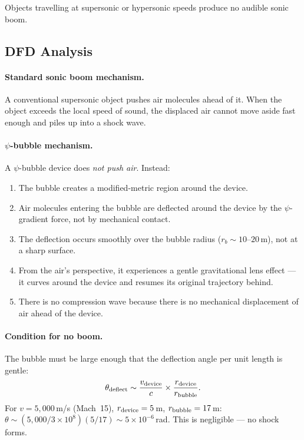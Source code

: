 \documentclass[12pt,a4paper]{article}
\begin{document}
Objects travelling at supersonic or hypersonic speeds produce no audible
sonic boom.

\subsection{DFD Analysis}

\paragraph{Standard sonic boom mechanism.}
A conventional supersonic object pushes air molecules ahead of it.  When
the object exceeds the local speed of sound, the displaced air cannot
move aside fast enough and piles up into a shock wave.

\paragraph{$\psi$-bubble mechanism.}
A $\psi$-bubble device does \emph{not push air}.  Instead:
\begin{enumerate}
\item The bubble creates a modified-metric region around the device.
\item Air molecules entering the bubble are deflected around the device
  by the $\psi$-gradient force, not by mechanical contact.
\item The deflection occurs smoothly over the bubble radius
  ($r_b \sim 10$--$20$\,m), not at a sharp surface.
\item From the air's perspective, it experiences a gentle gravitational
  lens effect --- it curves around the device and resumes its
  original trajectory behind.
\item There is no compression wave because there is no mechanical
  displacement of air ahead of the device.
\end{enumerate}

\paragraph{Condition for no boom.}
The bubble must be large enough that the deflection angle per unit
length is gentle:
\begin{equation}
\theta_{\rm deflect} \sim \frac{v_{\rm device}}{c} \times \frac{r_{\rm device}}{r_{\rm bubble}}.
\end{equation}
For $v = 5{,}000$\,m/s (Mach~15), $r_{\rm device} = 5$\,m,
$r_{\rm bubble} = 17$\,m:
$\theta \sim (5{,}000/3\times 10^8)(5/17) \sim 5\times 10^{-6}$\,rad.
This is negligible --- no shock forms.
\end{document}
